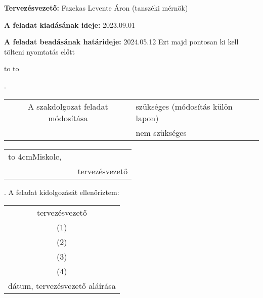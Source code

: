 \begin{small}
    \noindent\textbf{Tervez\'esvezet\H o:} Fazekas Levente \'Aron (tansz\'eki m\'ern\"ok) \newline


    \noindent\textbf{A feladat kiadásának ideje:} 2023.09.01\newline

    \noindent\textbf{A feladat beadásának határideje:} 2024.05.12 {\color{red} Ezt majd pontosan ki kell t\"olteni nyomtat\'as el\H ott}

    \vskip 1cm

    \hbox to 
    \hbox to 

\end{small}
\newpage

.

\begin{tabular}{cl}
    A szakdolgozat feladat módosítása & szükséges (módosítás külön lapon) \\
                                      & nem szükséges                     \\
\end{tabular}
\vskip2mm
\begin{tabularx}{.9\textwidth}{c C C}
    \hbox to 4cm{Miskolc,\dotfill} &  & \dotfill            \\
                                   &  & tervez\'esvezet\H o \\
\end{tabularx}
\vskip1.5mm

. A feladat kidolgozását ellenőriztem:

\vskip1.5mm

\begin{tabularx}{.9\textwidth}{@{\hspace*{7cm}}C}
    tervez\'esvezet\H o \\
    (1) \dotfill        \\
    (2) \dotfill        \\
    (3) \dotfill        \\
    (4) \dotfill        \\
    dátum,  tervezésvezető aláírása
\end{tabularx}

